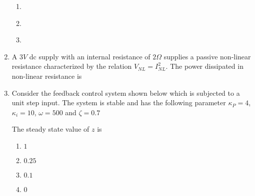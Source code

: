 \documentclass[journal]{IEEEtran}
\numberwithin{equation}{enumi}
\numberwithin{figure}{enumi}
\begin{document}
\begin{enumerate}
\begin{multicols}{2}
\begin{enumerate}
        \item  
        \begin{figure}[H]
        \centering
        \resizebox{0.4\textwidth}{!}{}
        \end{figure}

        \item  
        \begin{figure}[H]
        \centering
        \resizebox{0.4\textwidth}{!}{}
        \end{figure}

        \item  
        \begin{figure}[H]
        \centering
        \resizebox{0.4\textwidth}{!}{}
        \end{figure}
    \end{enumerate}
    \end{multicols}

    \item 
    A $3V$ dc supply with an internal resistance of $2\Omega$ supplies a passive non-linear resistance characterized by the relation $V_{NL} = I_{NL}^2$. The power dissipated in non-linear resistance is
    \hfill{}
    \begin{enumerate}
    \end{enumerate}

    \item 
    Consider the feedback control system shown below which is subjected to a unit step input. The system is stable and has the following parameter $\kappa_P = 4$, $\kappa_i = 10$, $\omega = 500$ and $\zeta = 0.7$

    \begin{figure}[H]
    \centering
    \resizebox{1\textwidth}{!}{}
    \end{figure}

    The steady state value of $z$ is
    \hfill{}
    \begin{multicols}{4}
        \begin{enumerate}
            \item $1$
            \item $0.25$
            \item $0.1$
            \item $0$
        \end{enumerate}
    \end{multicols}


\end{enumerate}
\end{document}
